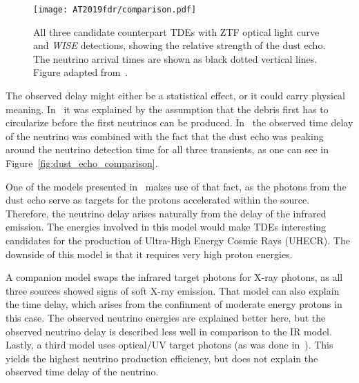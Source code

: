 \begin{figure*}[htb]
    \texttt{[image: AT2019fdr/comparison.pdf]}
    \caption[All candidate counterparts in comparison]{All three candidate counterpart TDEs with ZTF optical light curve and \textit{WISE} detections, showing the relative strength of the dust echo. The neutrino arrival times are shown as black dotted vertical lines. Figure adapted from~\cite{Velzen2021}.}
\end{figure*}

The observed delay might either be a statistical effect, or it could carry physical meaning. In~\cite{Velzen2021} it was explained by the assumption that the debris first has to circularize before the first neutrinos can be produced. In~ the observed time delay of the neutrino was combined with the fact that the dust echo was peaking around the neutrino detection time for all three transients, as one can see in Figure~\ref{fig:dust_echo_comparison}.

One of the models presented in~\cite{Winter2023} makes use of that fact, as the photons from the dust echo serve as targets for the protons accelerated within the source. Therefore, the neutrino delay arises naturally from the delay of the infrared emission. The energies involved in this model would make TDEs interesting candidates for the production of Ultra-High Energy Cosmic Rays (UHECR). The downside of this model is that it requires very high proton energies.

A companion model swaps the infrared target photons for X-ray photons, as all three sources showed signs of soft X-ray emission. That model can also explain the time delay, which arises from the confinment of moderate energy protons in this case. The observed neutrino energies are explained better here, but the observed neutrino delay is described less well in comparison to the IR model. Lastly, a third model uses optical/UV target photons (as was done in~\cite{Velzen2021}). This yields the highest neutrino production efficiency, but does not explain the observed time delay of the neutrino.